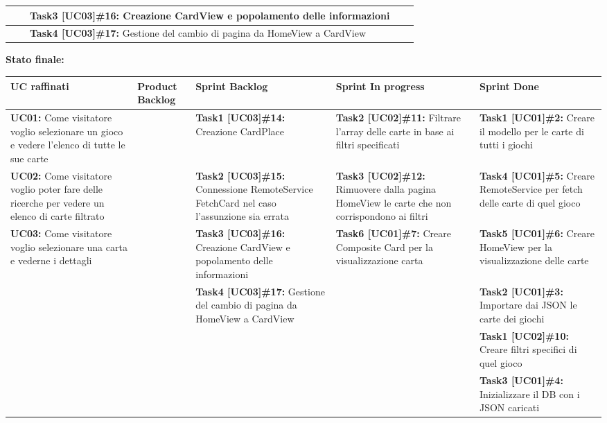 \documentclass{article}
\begin{document}
\begin{itemize}
\begin{tabular}{ | p{3.5cm} | p{1.5cm} | p{5cm} | p{1.6cm} | p{1.6cm} | }
            \hline
            & & \textbf{Task3 [UC03]\#16:} Creazione CardView e popolamento delle informazioni & & \\
            \hline
            & & \textbf{Task4 [UC03]\#17:} Gestione del cambio di pagina da HomeView a CardView & & \\
            \hline
        \end{tabular}
        \newpage
        \textbf{Stato finale:}
        \newline
        \newline
        \begin{tabular}{ | p{2.4cm} | p{1.4cm} | p{2.7cm} | p{3.4cm} | p{3cm} | }
            \hline
            \textbf{UC raffinati}
            & \textbf{Product Backlog}
            & \textbf{Sprint Backlog}
            & \textbf{Sprint In progress}
            & \textbf{Sprint Done} \\
            \hline
            \textbf{UC01:} Come visitatore voglio selezionare un gioco e vedere l'elenco di tutte le sue carte
            & & \textbf{Task1 [UC03]\#14:} Creazione CardPlace
            & \textbf{Task2 [UC02]\#11:} Filtrare l'array delle carte in base ai filtri specificati
            & \textbf{Task1 [UC01]\#2:} Creare il modello per le carte di tutti i giochi \\
            \hline
            \textbf{UC02:} Come visitatore voglio poter fare delle ricerche per vedere un elenco di carte filtrato
            & & \textbf{Task2 [UC03]\#15:} Connessione RemoteService FetchCard nel caso l'assunzione sia errata
            & \textbf{Task3 [UC02]\#12:} Rimuovere dalla pagina HomeView le carte che non corrispondono ai filtri
            & \textbf{Task4 [UC01]\#5:} Creare RemoteService per fetch delle carte di quel gioco \\
            \hline
            \textbf{UC03:} Come visitatore voglio selezionare una carta e vederne i dettagli
            & & \textbf{Task3 [UC03]\#16:} Creazione CardView e popolamento delle informazioni
            & \textbf{Task6 [UC01]\#7:} Creare Composite Card per la visualizzazione carta
            & \textbf{Task5 [UC01]\#6:} Creare HomeView per la visualizzazione delle carte \\
            \hline
            & & \textbf{Task4 [UC03]\#17:} Gestione del cambio di pagina da HomeView a CardView
            & & \textbf{Task2 [UC01]\#3:} Importare dai JSON le carte dei giochi \\
            \hline
            & & & & \textbf{Task1 [UC02]\#10:} Creare filtri specifici di quel gioco  \\
            \hline
            & & & & \textbf{Task3 [UC01]\#4:} Inizializzare il DB con i JSON caricati \\
            \hline
        \end{tabular}
    \end{itemize}
\end{document}
